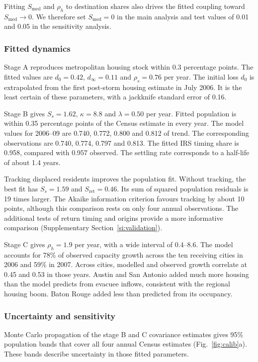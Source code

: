 \documentclass[11pt]{article}
\begin{document}
Fitting $S_{\text{med}}$ and $\rho_h$ to destination shares also drives the fitted coupling toward $S_{\text{med}}\to0$. We therefore set $S_{\text{med}}=0$ in the main analysis and test values of 0.01 and 0.05 in the sensitivity analysis.

\subsubsection{Fitted dynamics}
Stage A reproduces metropolitan housing stock within 0.3 percentage points. The fitted values are $d_0=0.42$, $d_\infty=0.11$ and $\rho_s=0.76$ per year. The initial loss $d_0$ is extrapolated from the first post-storm housing estimate in July 2006. It is the least certain of these parameters, with a jackknife standard error of 0.16.

Stage B gives $S_s=1.62$, $\kappa=8.8$ and $\lambda=0.50$ per year. Fitted population is within 0.35 percentage points of the Census estimate in every year. The model values for 2006--09 are 0.740, 0.772, 0.800 and 0.812 of trend. The corresponding observations are 0.740, 0.774, 0.797 and 0.813. The fitted IRS timing share is 0.958, compared with 0.957 observed. The settling rate corresponds to a half-life of about 1.4 years.

Tracking displaced residents improves the population fit. Without tracking, the best fit has $S_s=1.59$ and $S_{\text{ret}}=0.46$. Its sum of squared population residuals is 19 times larger. The Akaike information criterion favours tracking by about 10 points, although this comparison rests on only four annual observations. The additional tests of return timing and origins provide a more informative comparison (Supplementary Section~\ref{si:validation}).

Stage C gives $\rho_h=1.9$ per year, with a wide interval of 0.4--8.6. The model accounts for 78\% of observed capacity growth across the ten receiving cities in 2006 and 59\% in 2007. Across cities, modelled and observed growth correlate at 0.45 and 0.53 in those years. Austin and San Antonio added much more housing than the model predicts from evacuee inflows, consistent with the regional housing boom. Baton Rouge added less than predicted from its occupancy.

\subsubsection{Uncertainty and sensitivity}\label{si:sensitivity}
Monte Carlo propagation of the stage B and C covariance estimates gives 95\% population bands that cover all four annual Census estimates (Fig.~\ref{fig:calib}a). These bands describe uncertainty in those fitted parameters.
\end{document}
